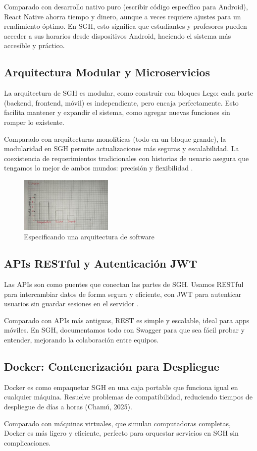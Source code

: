 Comparado con desarrollo nativo puro (escribir código específico para Android), React Native ahorra tiempo y dinero, aunque a veces requiere ajustes para un rendimiento óptimo. En SGH, esto significa que estudiantes y profesores pueden acceder a sus horarios desde dispositivos Android, haciendo el sistema más accesible y práctico.

\subsection{Arquitectura Modular y Microservicios}
La arquitectura de SGH es modular, como construir con bloques Lego: cada parte (backend, frontend, móvil) es independiente, pero encaja perfectamente. Esto facilita mantener y expandir el sistema, como agregar nuevas funciones sin romper lo existente.

Comparado con arquitecturas monolíticas (todo en un bloque grande), la modularidad en SGH permite actualizaciones más seguras y escalabilidad. La coexistencia de requerimientos tradicionales con historias de usuario asegura que tengamos lo mejor de ambos mundos: precisión y flexibilidad \cite{izaurralde2013}.

\begin{figure}[h]
    \centering
    \includegraphics[width=0.4\textwidth]{graphics/Especificando una arquitectura de software.png}
    \caption{Especificando una arquitectura de software}
    \label{fig:arquitectura}
\end{figure}



\subsection{APIs RESTful y Autenticación JWT}
Las APIs son como puentes que conectan las partes de SGH. Usamos RESTful para intercambiar datos de forma segura y eficiente, con JWT para autenticar usuarios sin guardar sesiones en el servidor \cite{cein2025}.

Comparado con APIs más antiguas, REST es simple y escalable, ideal para apps móviles. En SGH, documentamos todo con Swagger para que sea fácil probar y entender, mejorando la colaboración entre equipos.

\subsection{Docker: Contenerización para Despliegue}
Docker es como empaquetar SGH en una caja portable que funciona igual en cualquier máquina. Resuelve problemas de compatibilidad, reduciendo tiempos de despliegue de días a horas (Chamú, 2025).

Comparado con máquinas virtuales, que simulan computadoras completas, Docker es más ligero y eficiente, perfecto para orquestar servicios en SGH sin complicaciones.

